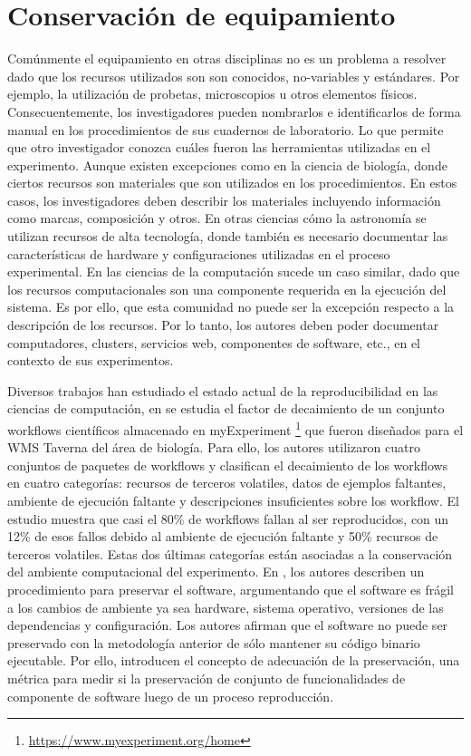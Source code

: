 \section{Conservación de equipamiento}
Comúnmente el equipamiento en otras disciplinas no es un problema a resolver dado que los recursos utilizados son son conocidos, no-variables y estándares. Por ejemplo, la utilización de probetas, microscopios u otros elementos físicos. 
Consecuentemente, los investigadores pueden nombrarlos e identificarlos de forma manual en los procedimientos de sus cuadernos de laboratorio. Lo que permite que otro investigador conozca cuáles fueron las herramientas utilizadas en el experimento.
Aunque existen excepciones como en la ciencia de biología, donde ciertos recursos son materiales que son utilizados en los procedimientos. En estos casos, los investigadores deben describir los materiales incluyendo información como marcas, composición y otros. 
En otras ciencias cómo la astronomía se utilizan recursos  de alta tecnología, donde también es necesario documentar las características de hardware y configuraciones utilizadas en el proceso experimental. 
En las ciencias de la computación sucede un caso similar, dado que los recursos computacionales son una componente requerida en la ejecución del sistema. 
Es por ello, que esta comunidad no puede ser la excepción respecto a la descripción de los recursos. Por lo tanto, los autores deben poder documentar computadores, clusters, servicios web, componentes de software, etc., en el contexto de sus experimentos.

Diversos trabajos han estudiado el estado actual de la reproducibilidad en las ciencias de computación, en \cite{DBLP:conf/eScience/ZhaoGBKGGHRRG12} se estudia el factor de decaimiento de un conjunto workflows científicos almacenado en myExperiment \footnote{\url{https://www.myexperiment.org/home}} que fueron diseñados para el WMS Taverna \cite{DBLP:journals/bioinformatics/OinnAFMSGCGPWL04} del área de biología. Para ello, los autores utilizaron cuatro conjuntos de paquetes de workflows y clasifican el decaimiento de los workflows en cuatro categorías: recursos de terceros volatiles, datos de ejemplos faltantes, ambiente de ejecución faltante y descripciones insuficientes sobre los workflow. El estudio muestra que casi el 80\% de workflows fallan al ser reproducidos, con un 12\% de esos fallos debido al ambiente de ejecución faltante y 50\% recursos de terceros volatiles. Estas dos últimas categorías están asociadas a la conservación del ambiente computacional del experimento.
En \cite{DBLP:conf/ipres/MatthewsCWJBS09}, los autores describen un procedimiento para preservar el software, argumentando que el software es frágil a los cambios de ambiente ya sea hardware, sistema operativo, versiones de las dependencias y configuración. Los autores afirman que el software no puede ser preservado con la metodología anterior de sólo mantener su código binario ejecutable. Por ello, introducen el concepto de adecuación de la preservación, una métrica para medir si la preservación de conjunto de funcionalidades de componente de software luego de un proceso reproducción.

